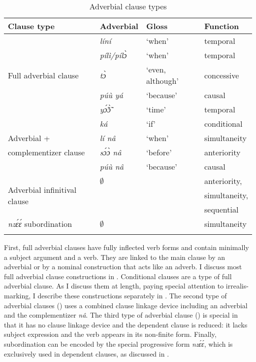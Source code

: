 \begin{table}

\begin{tabularx}{\textwidth}{X lll}
 \lsptoprule
Clause type	&	Adverbial & Gloss & Function\\
 \midrule
\multirow{5}{*}{{Full adverbial clause}}  &  {\itshape líní} & `when' & temporal \\
				& {\itshape pílì/pílɔ̀} & `when' & temporal \\
				& {\itshape tɔ̀}      & `even, although' & concessive \\
				& {\itshape púù yá} & `because' & causal \\
				& {\itshape yɔ̃́ɔ̃̀} & `time' & temporal \\
				& {\itshape ká}     & `if'           & conditional \\  \midrule
Adverbial +  &  {\itshape lí nâ} & `when' & simultaneity \\ 
complementizer clause				& {\itshape sɔ́ɔ̀ nâ} & `before' & anteriority \\
				& {\itshape púù nâ} & `because' & causal \\  \midrule
\multirow{3}{*}{Adverbial infinitival clause}   & $\emptyset$   &   & anteriority,  \\
                                                 &    &   & simultaneity, \\
                                                &    &   & sequential \\  \midrule
{{\itshape nzɛ́ɛ́} subordination} &  $\emptyset$ &  & simultaneity\\
 \lspbottomrule
\end{tabularx}
\caption{Adverbial clause types}
\label{Tab:ADVC}
\end{table}

First, full adverbial clauses have fully inflected verb forms and contain minimally a subject argument and a verb. They are linked to the main clause by an adverbial or by a nominal construction that acts like an adverb. I discuss most full adverbial clause constructions in . Conditional clauses are a type of full adverbial clause. As I discuss them at length, paying special attention to irrealis-marking, I describe these constructions separately in . The second type of adverbial clauses () uses a combined clause linkage device including an adverbial and the complementizer {\itshape nâ}. The third type of adverbial clause () is special in that it has no clause linkage device and the dependent clause is reduced: it lacks subject expression and the verb appears in its non-finite form. Finally, subordination can be encoded by the special progressive form {\itshape nzɛ́ɛ́}, which is exclusively used in dependent clauses, as discussed in .



